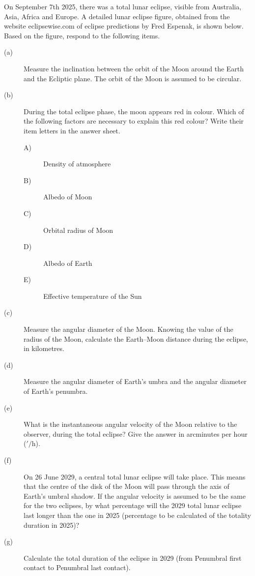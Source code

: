 On September 7th 2025, there was a total lunar eclipse, visible from Australia, Asia, Africa and Europe. A detailed lunar eclipse figure, obtained from the website eclipsewise.com of eclipse predictions by Fred Espenak, is shown below. Based on the figure, respond to the following items.
\begin{description}
\item[(a)] Measure the inclination between the orbit of the Moon around the Earth and the Ecliptic plane. The orbit of the Moon is assumed to be circular.
\item[(b)] During the total eclipse phase, the moon appears red in colour. Which of the following factors are necessary to explain this red colour? Write their item letters in the answer sheet.
\begin{description}
\item[A)] Density of atmosphere
\item[B)] Albedo of Moon
\item[C)] Orbital radius of Moon
\item[D)] Albedo of Earth
\item[E)] Effective temperature of the Sun
\end{description}
\item[(c)] Measure the angular diameter of the Moon. Knowing the value of the radius of the Moon, calculate the Earth--Moon distance during the eclipse, in kilometres.
\item[(d)] Measure the angular diameter of Earth's umbra and the angular diameter of Earth's penumbra.
\item[(e)] What is the instantaneous angular velocity of the Moon relative to the observer, during the total eclipse? Give the answer in arcminutes per hour ($'/\mathrm h$).
\item[(f)] On 26 June 2029, a central total lunar eclipse will take place. This means that the centre of the disk of the Moon will pass through the axis of Earth's umbral shadow. If the angular velocity is assumed to be the same for the two eclipses, by what percentage will the 2029 total lunar eclipse last longer than the one in 2025 (percentage to be calculated of the totality duration in 2025)?
\item[(g)] Calculate the total duration of the eclipse in 2029 (from Penumbral first contact to Penumbral last contact).
\end{description}
